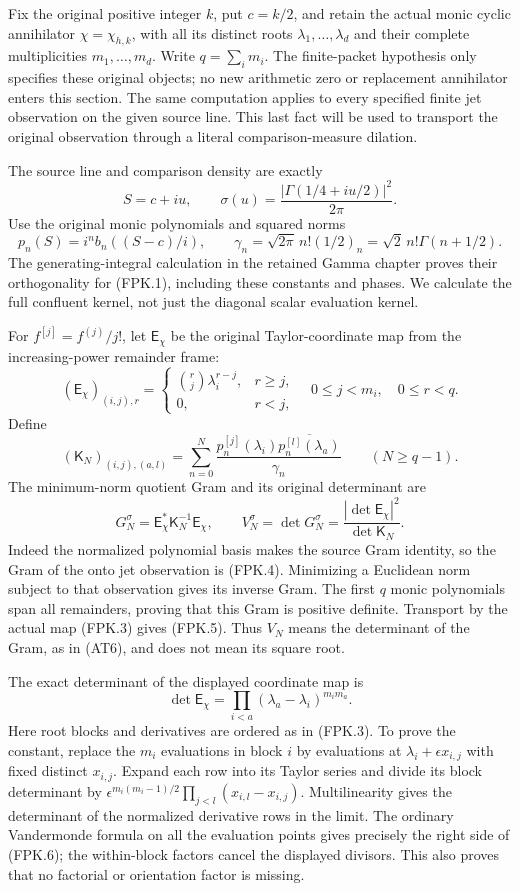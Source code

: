 \documentclass[11pt,a4paper]{article}
\begin{document}
Fix the original positive integer $k$, put $c=k/2$, and retain the
actual monic cyclic annihilator $\chi=\chi_{h,k}$, with all its
distinct roots $\lambda_1,\ldots,\lambda_d$ and their complete
multiplicities $m_1,\ldots,m_d$. Write $q=\sum_i m_i$.
The finite-packet hypothesis only specifies these original objects;
no new arithmetic zero or replacement annihilator enters this section.
The same computation applies to every specified finite jet observation
on the given source line. This last fact will be used to transport the
original observation through a literal comparison-measure dilation.

The source line and comparison density are exactly
\[
 S=c+iu,\qquad
 \sigma(u)=\frac{|\Gamma(1/4+iu/2)|^2}{2\pi}.
 \tag{FPK.1}
\]
Use the original monic polynomials and squared norms
\[
 p_n(S)=i^n b_n((S-c)/i),\qquad
 \gamma_n=\sqrt{2\pi}\,n!(1/2)_n
          =\sqrt2\,n!\Gamma(n+1/2).
 \tag{FPK.2}
\]
The generating-integral calculation in the retained Gamma chapter proves
their orthogonality for (FPK.1), including these constants and phases.
We calculate the full confluent kernel, not just the diagonal scalar
evaluation kernel.

For $f^{[j]}=f^{(j)}/j!$, let $\mathsf E_\chi$ be the original
Taylor-coordinate map from the increasing-power remainder frame:
\[
 (\mathsf E_\chi)_{(i,j),r}
   =\begin{cases}\binom rj\lambda_i^{r-j},&r\geq j,\\0,&r<j,
     \end{cases}
 \quad 0\leq j<m_i,\quad 0\leq r<q.
 \tag{FPK.3}
\]
Define
\[
 (\mathsf K_N)_{(i,j),(a,l)}
   =\sum_{n=0}^N
      \frac{p_n^{[j]}(\lambda_i)
                   \overline{p_n^{[l]}(\lambda_a)}}{\gamma_n}
       \qquad(N\geq q-1).
 \tag{FPK.4}
\]
The minimum-norm quotient Gram and its original determinant are
\[
 G_N^\sigma=\mathsf E_\chi^*\mathsf K_N^{-1}\mathsf E_\chi,
 \qquad V_N^\sigma=\det G_N^\sigma
         =\frac{|\det\mathsf E_\chi|^2}{\det\mathsf K_N}.
 \tag{FPK.5}
\]
Indeed the normalized polynomial basis makes the source Gram identity,
so the Gram of the onto jet observation is (FPK.4). Minimizing a
Euclidean norm subject to that observation gives its inverse Gram.
The first $q$ monic polynomials span all remainders, proving that this
Gram is positive definite. Transport by the actual map (FPK.3) gives
(FPK.5). Thus $V_N$ means the determinant of the Gram, as in (AT6),
and does not mean its square root.

The exact determinant of the displayed coordinate map is
\[
 \det\mathsf E_\chi
       =\prod_{i<a}(\lambda_a-\lambda_i)^{m_i m_a}.
 \tag{FPK.6}
\]
Here root blocks and derivatives are ordered as in (FPK.3).
To prove the constant, replace the $m_i$ evaluations in block $i$
by evaluations at $\lambda_i+\epsilon x_{i,j}$ with fixed distinct
$x_{i,j}$. Expand each row into its Taylor series and divide its
block determinant by
$\epsilon^{m_i(m_i-1)/2}\prod_{j<l}(x_{i,l}-x_{i,j})$.
Multilinearity gives the determinant of the normalized derivative
rows in the limit. The ordinary Vandermonde formula on all the
evaluation points gives precisely the right side of (FPK.6);
the within-block factors cancel the displayed divisors. This also
proves that no factorial or orientation factor is missing.
\end{document}
